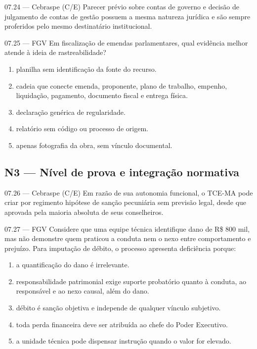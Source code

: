 \begin{questao}{ 07.24 — Cebraspe (C/E)}
Parecer prévio sobre contas de governo e decisão de julgamento de contas de gestão possuem a mesma natureza jurídica e são sempre proferidos pelo mesmo destinatário institucional.
\end{questao}

\begin{questao}{ 07.25 — FGV}
Em fiscalização de emendas parlamentares, qual evidência melhor atende à ideia de rastreabilidade?
\begin{enumerate}[label=\Alph*)]
\item planilha sem identificação da fonte do recurso.
\item cadeia que conecte emenda, proponente, plano de trabalho, empenho, liquidação, pagamento, documento fiscal e entrega física.
\item declaração genérica de regularidade.
\item relatório sem código ou processo de origem.
\item apenas fotografia da obra, sem vínculo documental.
\end{enumerate}
\end{questao}

\subsection*{N3 — Nível de prova e integração normativa}

\begin{questao}{ 07.26 — Cebraspe (C/E)}
Em razão de sua autonomia funcional, o TCE-MA pode criar por regimento hipótese de sanção pecuniária sem previsão legal, desde que aprovada pela maioria absoluta de seus conselheiros.
\end{questao}

\begin{questao}{ 07.27 — FGV}
Considere que uma equipe técnica identifique dano de R\$ 800 mil, mas não demonstre quem praticou a conduta nem o nexo entre comportamento e prejuízo. Para imputação de débito, o processo apresenta deficiência porque:
\begin{enumerate}[label=\Alph*)]
\item a quantificação do dano é irrelevante.
\item responsabilidade patrimonial exige suporte probatório quanto à conduta, ao responsável e ao nexo causal, além do dano.
\item débito é sanção objetiva e independe de qualquer vínculo subjetivo.
\item toda perda financeira deve ser atribuída ao chefe do Poder Executivo.
\item a unidade técnica pode dispensar instrução quando o valor for elevado.
\end{enumerate}
\end{questao}

